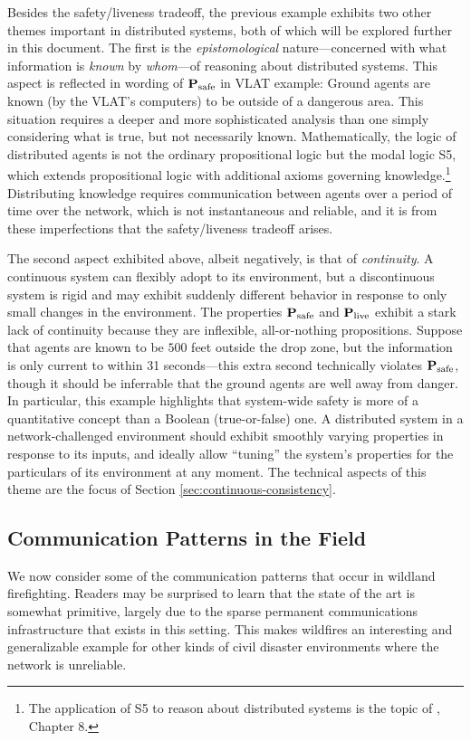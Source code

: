 \documentclass[]             %
{NASA}                       %
\theoremstyle{definition}
\begin{document}
Besides the safety/liveness tradeoff, the previous example exhibits
two other themes important in distributed systems, both of which will
be explored further in this document. The first is the
\emph{epistomological} nature---concerned with what information is
\emph{known} by \emph{whom}---of reasoning about distributed
systems. This aspect is reflected in wording of
$\textbf{P}_\textrm{safe}$ in VLAT example: Ground agents are known
(by the VLAT's computers) to be outside of a dangerous area. This
situation requires a deeper and more sophisticated analysis than one
simply considering what is true, but not necessarily
known. Mathematically, the logic of distributed agents is not the
ordinary propositional logic but the modal logic S5, which extends
propositional logic with additional axioms governing
knowledge.\footnote{The application of S5 to reason about distributed
  systems is the topic of \cite{kshemkalyani_singhal_2008}, Chapter
  8.} Distributing knowledge requires communication between agents
over a period of time over the network, which is not instantaneous and
reliable, and it is from these imperfections that the safety/liveness
tradeoff arises.

The second aspect exhibited above, albeit negatively, is that of
\emph{continuity}. A continuous system can flexibly adopt to its
environment, but a discontinuous system is rigid and may exhibit
suddenly different behavior in response to only small changes in the
environment. The properties $\textbf{P}_\textrm{safe}$ and
$\textbf{P}_\textrm{live}$ exhibit a stark lack of continuity because
they are inflexible, all-or-nothing propositions. Suppose that agents
are known to be $500$ feet outside the drop zone, but the information
is only current to within 31 seconds---this extra second technically
violates $\textbf{P}_\textrm{safe}$, though it should be inferrable
that the ground agents are well away from danger. In particular, this
example highlights that system-wide safety is more of a quantitative
concept than a Boolean (true-or-false) one. A distributed system in a
network-challenged environment should exhibit smoothly varying
properties in response to its inputs, and ideally allow ``tuning'' the
system's properties for the particulars of its environment at any
moment. The technical aspects of this theme are the focus of Section
\ref{sec:continuous-consistency}.

\subsection{Communication Patterns in the Field}
\label{ssec:communication-patterns}
We now consider some of the communication patterns that occur in
wildland firefighting. Readers may be surprised to learn that the
state of the art is somewhat primitive, largely due to the sparse
permanent communications infrastructure that exists in this
setting. This makes wildfires an interesting and generalizable example
for other kinds of civil disaster environments where the network is
unreliable.
\end{document}
